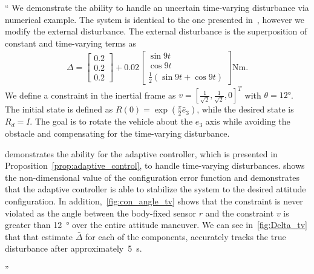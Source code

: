 \documentclass[11pt]{article}
\newcommand{\parenth}[1]{\ensuremath{\left( #1 \right)}}
\newenvironment{correction}{\begin{list}{}{\setlength{\leftmargin}{1cm}\setlength{\rightmargin}{1cm}}\vspace{\parsep}\item[]``}{''\end{list}}
\begin{document}
\begin{enumerate}
\begin{correction}
    We demonstrate the ability to handle an uncertain time-varying disturbance via numerical example.
    The system is identical to the one presented in~, however we modify the external disturbance. 
    The external disturbance is the superposition of constant and time-varying terms as
    \begin{align*}
        \Delta = \begin{bmatrix} 0.2 \\ 0.2 \\0.2 \end{bmatrix} + 0.02 \begin{bmatrix} \sin 9 t \\ \cos 9 t \\ \frac{1}{2} \parenth{\sin 9t + \cos 9t}\end{bmatrix} \si{\newton\meter}.
    \end{align*}
    We define a constraint in the inertial frame as \( v = [\frac{1}{\sqrt{2}}, \frac{1}{\sqrt{2}}, 0]^T \) with \( \theta = \ang{12} \).
    The initial state is defined as \(R(0) = \exp( \frac{\pi}{2} \hat{e}_3) \), while the desired state is \(R_d =I \).
    The goal is to rotate the vehicle about the \( e_3 \) axis while avoiding the obstacle and compensating for the time-varying disturbance. 

     demonstrates the ability for the adaptive controller, which is presented in Proposition~\ref{prop:adaptive_control}, to handle time-varying disturbances.
     shows the non-dimensional value of the configuration error function and demonstrates that the adaptive controller is able to stabilize the system to the desired attitude configuration.
    In addition,~\cref{fig:con_angle_tv} shows that the constraint is never violated as the angle between the body-fixed sensor \( r \) and the constraint \( v \) is greater than \SI{12}{\degree} over the entire attitude maneuver.
    We can see in~\cref{fig:Delta_tv} that that estimate \(\bar \Delta \) for each of the components, accurately tracks the true disturbance after approximately~\SI{5}{\second}.


\end{correction}
\end{enumerate}
\end{document}
